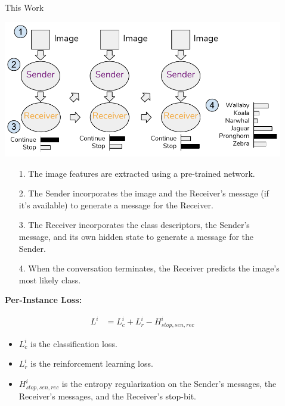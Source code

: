 \documentclass[final]{beamer}
\newlength{\sepwid}
\newlength{\onecolwid}
\begin{document}
\begin{frame}[t]
\begin{columns}[t]
\begin{column}{\onecolwid}
\end{column} %

\begin{column}{\sepwid}\end{column} %

\begin{column}{\onecolwid}


\begin{block}{This Work}

\begin{center}
\includegraphics[width=0.8\linewidth]{figures/ref_game_evtimova_2.pdf}
\end{center}

\begin{enumerate}
\item[1.] The image features are extracted using a pre-trained network.
\item[2.] The Sender incorporates the image and the Receiver's message (if it's available) to generate a message for the Receiver.
\item[3.] The Receiver incorporates the class descriptors, the Sender's message, and its own hidden state to generate a message for the Sender.
\item[4.] When the conversation terminates, the Receiver predicts the image's most likely class.
\end{enumerate}

\vspace{22mm}

\textbf{Per-Instance Loss:}

\begin{align*}
L^i &= L^i_{c} + L^i_{r} - H^i_{stop,sen,rec}
\end{align*}

\begin{itemize}
\item $L^i_{c}$ is the classification loss.
\item $L^i_{r}$ is the reinforcement learning loss.
\item $H^i_{stop,sen,rec}$ is the entropy regularization on the Sender's messages, the Receiver's messages, and the Receiver's stop-bit.
\end{itemize}


\end{block}
\end{column}
\end{columns}
\end{frame}
\end{document}
